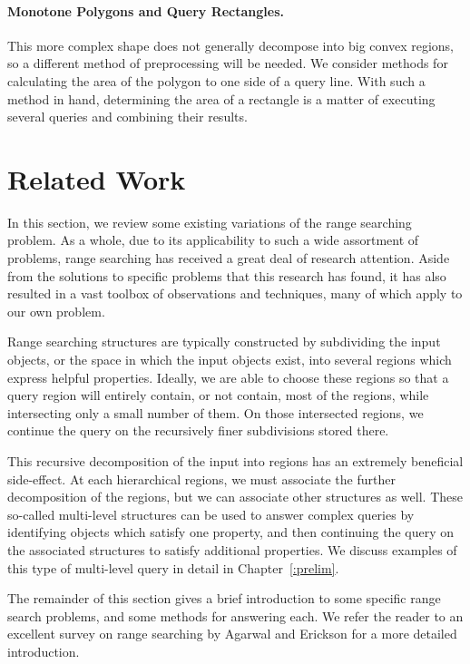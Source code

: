 \paragraph{Monotone Polygons and Query Rectangles.} This more complex shape does not generally decompose into big convex regions, so a different method of preprocessing will be needed.
We consider methods for calculating the area of the polygon to one side of a query line. 
With such a method in hand, determining the area of a rectangle is a matter of executing several queries and combining their results.

\section{Related Work}
\label{:intro:related}

In this section, we review some existing variations of the range searching problem.
As a whole, due to its applicability to such a wide assortment of problems, range searching has received a great deal of research attention.
Aside from the solutions to specific problems that this research has found, it has also resulted in a vast toolbox of observations and techniques, many of which apply to our own problem.

Range searching structures are typically constructed by subdividing the input objects, or the space in which the input objects exist, into several regions which express helpful properties.
Ideally, we are able to choose these regions so that a query region will entirely contain, or not contain, most of the regions, while intersecting only a small number of them.
On those intersected regions, we continue the query on the recursively finer subdivisions stored there.\cite{Matousek93}

This recursive decomposition of the input into regions has an extremely beneficial side-effect. 
At each hierarchical regions, we must associate the further decomposition of the regions, but we can associate other structures as well.
These so-called multi-level structures can be used to answer complex queries by identifying objects which satisfy one property, and then continuing the query on the associated structures to satisfy additional properties.
We discuss examples of this type of multi-level query in detail in Chapter~\ref{:prelim}.

The remainder of this section gives a brief introduction to some specific range search problems, and some methods for answering each. 
We refer the reader to an excellent survey on range searching by Agarwal and Erickson\cite{Agarwal99} for a more detailed introduction.


